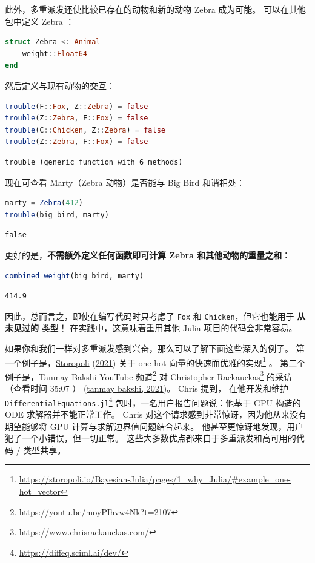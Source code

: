 \documentclass[
  notoc %
]{tufte-book}
\DeclareRobustCommand{\href}[2]{#2\footnote{\url{#1}}}
\newcommand{\passthrough}[1]{#1}
\begin{document}
此外，多重派发还使比较已存在的动物和新的动物 Zebra 成为可能。
可以在其他包中定义 Zebra ：

\begin{lstlisting}[language=Julia]
struct Zebra <: Animal
    weight::Float64
end
\end{lstlisting}

然后定义与现有动物的交互：

\begin{lstlisting}[language=Julia]
trouble(F::Fox, Z::Zebra) = false
trouble(Z::Zebra, F::Fox) = false
trouble(C::Chicken, Z::Zebra) = false
trouble(Z::Zebra, F::Fox) = false
\end{lstlisting}

\begin{lstlisting}[language=Output]
trouble (generic function with 6 methods)
\end{lstlisting}

现在可查看 Marty（Zebra 动物）是否能与 Big Bird 和谐相处：

\begin{lstlisting}[language=Julia]
marty = Zebra(412)
trouble(big_bird, marty)
\end{lstlisting}

\begin{lstlisting}[language=Output]
false
\end{lstlisting}

更好的是，\textbf{不需额外定义任何函数即可计算 Zebra
和其他动物的重量之和}：

\begin{lstlisting}[language=Julia]
combined_weight(big_bird, marty)
\end{lstlisting}

\begin{lstlisting}[language=Output]
414.9
\end{lstlisting}

因此，总而言之，即使在编写代码时只考虑了 \passthrough{\lstinline!Fox!}
和 \passthrough{\lstinline!Chicken!}，但它也能用于 \textbf{从未见过的}
类型！ 在实践中，这意味着重用其他 Julia 项目的代码会非常容易。

如果你和我们一样对多重派发感到兴奋，那么可以了解下面这些深入的例子。
第一个例子是，\protect\hyperlink{ref-storopoli2021bayesianjulia}{Storopoli}
(\protect\hyperlink{ref-storopoli2021bayesianjulia}{2021}) 关于
\href{https://storopoli.io/Bayesian-Julia/pages/1_why_Julia/\#example_one-hot_vector}{one-hot
向量的快速而优雅的实现} 。
第二个例子是，\href{https://youtu.be/moyPIhvw4Nk?t=2107}{Tanmay Bakshi
YouTube 频道} 对 \href{https://www.chrisrackauckas.com/}{Christopher
Rackauckas} 的采访 （查看时间 35:07 ）
(\protect\hyperlink{ref-tanmaybakshiBakingKnowledgeMachine2021}{tanmay
bakshi, 2021})。 Chris 提到， 在他开发和维护
\href{https://diffeq.sciml.ai/dev/}{\passthrough{\lstinline!DifferentialEquations.jl!}}
包时，一名用户报告问题说：他基于 GPU 构造的 ODE 求解器并不能正常工作。
Chris 对这个请求感到非常惊讶，因为他从来没有期望能够将 GPU
计算与求解边界值问题结合起来。
他甚至更惊讶地发现，用户犯了一个小错误，但一切正常。
这些大多数优点都来自于多重派发和高可用的代码 / 类型共享。
\end{document}
